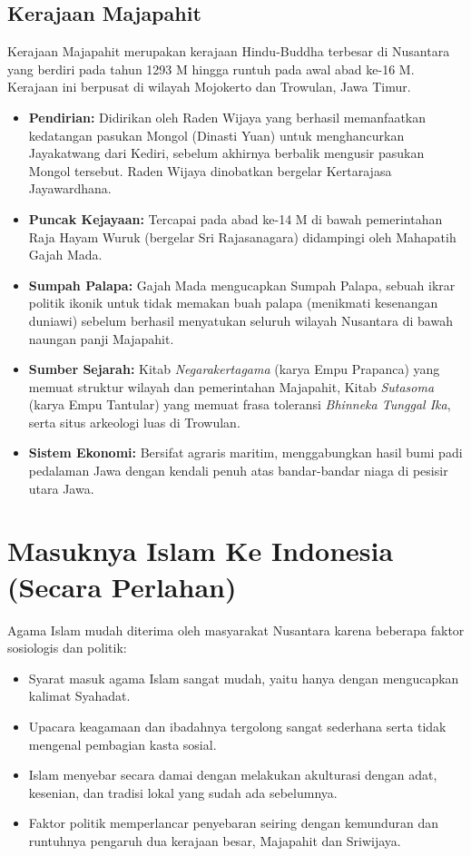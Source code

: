 \documentclass[12pt, a4paper]{article}
\begin{document}
\subsection{Kerajaan Majapahit}
Kerajaan Majapahit merupakan kerajaan Hindu-Buddha terbesar di Nusantara yang berdiri pada tahun 1293 M hingga runtuh pada awal abad ke-16 M. Kerajaan ini berpusat di wilayah Mojokerto dan Trowulan, Jawa Timur.
\begin{itemize}
	\item \textbf{Pendirian:} Didirikan oleh Raden Wijaya yang berhasil memanfaatkan kedatangan pasukan Mongol (Dinasti Yuan) untuk menghancurkan Jayakatwang dari Kediri, sebelum akhirnya berbalik mengusir pasukan Mongol tersebut. Raden Wijaya dinobatkan bergelar Kertarajasa Jayawardhana.
	\item \textbf{Puncak Kejayaan:} Tercapai pada abad ke-14 M di bawah pemerintahan Raja Hayam Wuruk (bergelar Sri Rajasanagara) didampingi oleh Mahapatih Gajah Mada.
	\item \textbf{Sumpah Palapa:} Gajah Mada mengucapkan Sumpah Palapa, sebuah ikrar politik ikonik untuk tidak memakan buah palapa (menikmati kesenangan duniawi) sebelum berhasil menyatukan seluruh wilayah Nusantara di bawah naungan panji Majapahit.
	\item \textbf{Sumber Sejarah:} Kitab \textit{Negarakertagama} (karya Empu Prapanca) yang memuat struktur wilayah dan pemerintahan Majapahit, Kitab \textit{Sutasoma} (karya Empu Tantular) yang memuat frasa toleransi \textit{Bhinneka Tunggal Ika}, serta situs arkeologi luas di Trowulan.
	\item \textbf{Sistem Ekonomi:} Bersifat agraris maritim, menggabungkan hasil bumi padi pedalaman Jawa dengan kendali penuh atas bandar-bandar niaga di pesisir utara Jawa.
\end{itemize}

\section{Masuknya Islam Ke Indonesia (Secara Perlahan)}
Agama Islam mudah diterima oleh masyarakat Nusantara karena beberapa faktor sosiologis dan politik:
\begin{itemize}
	\item Syarat masuk agama Islam sangat mudah, yaitu hanya dengan mengucapkan kalimat Syahadat.
	\item Upacara keagamaan dan ibadahnya tergolong sangat sederhana serta tidak mengenal pembagian kasta sosial.
	\item Islam menyebar secara damai dengan melakukan akulturasi dengan adat, kesenian, dan tradisi lokal yang sudah ada sebelumnya.
	\item Faktor politik memperlancar penyebaran seiring dengan kemunduran dan runtuhnya pengaruh dua kerajaan besar, Majapahit dan Sriwijaya.
\end{itemize}
\end{document}
